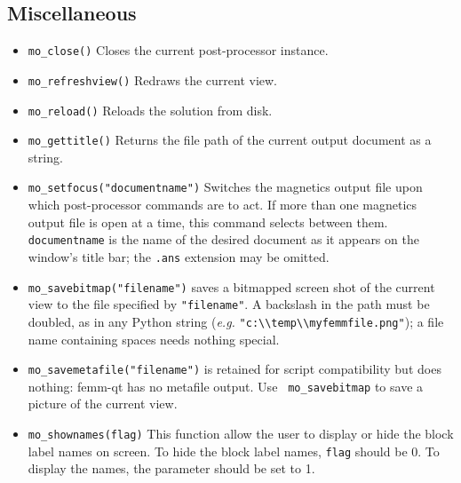 \subsection{Miscellaneous}
\begin{itemize}

\item{\tt mo\_close()} Closes the current post-processor instance.
\item{\tt mo\_refreshview()} Redraws the current view.
\item{\tt mo\_reload()} Reloads the solution from disk.
\item{\tt mo\_gettitle()} Returns the file path of the current output
document as a string.
\item{\tt mo\_setfocus("documentname")} Switches the magnetics output
file upon which post-processor commands are to act.  If more than one
magnetics output file is open at a time, this command selects between them.
{\tt documentname} is the name of the desired document as it appears on the
window's title bar; the {\tt .ans} extension may be omitted.
\item{\tt mo\_savebitmap("filename")} saves a bitmapped screen shot of the current
view to the file specified by {\tt "filename"}.  A backslash in the path
must be doubled, as in any Python string ({\em e.g.}
\verb+"c:\\temp\\myfemmfile.png"+); a file name containing spaces needs
nothing special.
\item{\tt mo\_savemetafile("filename")} is retained for script
compatibility but does nothing: femm-qt has no metafile output.  Use {\tt
mo\_savebitmap} to save a picture of the current view.
\item{\tt mo\_shownames(flag)} This function allow the user to display or hide the block label
names on screen.  To hide the block label names, {\tt flag} should be 0.  To display the
names, the parameter should be set to 1.


\end{itemize}
